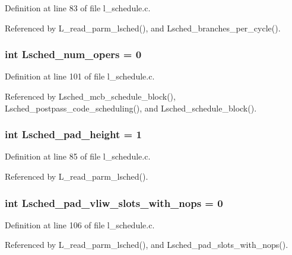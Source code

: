 Definition at line 83 of file l\_\-schedule.c.

Referenced by L\_\-read\_\-parm\_\-lsched(), and Lsched\_\-branches\_\-per\_\-cycle().
\subsubsection{\setlength{\rightskip}{0pt plus 5cm}int \bf{Lsched\_\-num\_\-opers} = 0}\label{l__schedule_8c_81a1b68006a09b691fdbe6e8d1fb354d}




Definition at line 101 of file l\_\-schedule.c.

Referenced by Lsched\_\-mcb\_\-schedule\_\-block(), Lsched\_\-postpass\_\-code\_\-scheduling(), and Lsched\_\-schedule\_\-block().
\subsubsection{\setlength{\rightskip}{0pt plus 5cm}int \bf{Lsched\_\-pad\_\-height} = 1}\label{l__schedule_8c_cdd4938179f0cfad035fefce3c2ced7a}




Definition at line 85 of file l\_\-schedule.c.

Referenced by L\_\-read\_\-parm\_\-lsched().
\subsubsection{\setlength{\rightskip}{0pt plus 5cm}int \bf{Lsched\_\-pad\_\-vliw\_\-slots\_\-with\_\-nops} = 0}\label{l__schedule_8c_b5f9a08750a50c4fa56c2f52f372749b}




Definition at line 106 of file l\_\-schedule.c.

Referenced by L\_\-read\_\-parm\_\-lsched(), and Lsched\_\-pad\_\-slots\_\-with\_\-nops().
